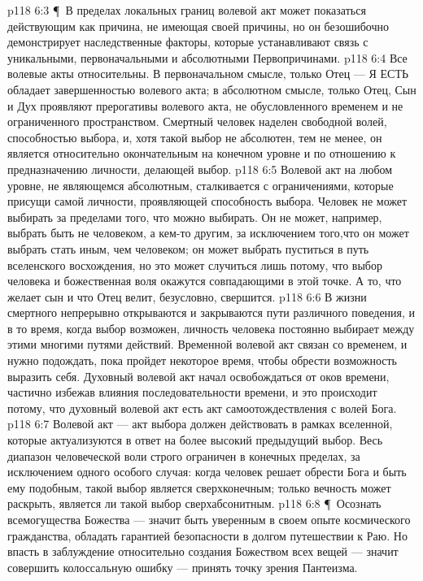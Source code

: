 \vs p118 6:3 \P\ В пределах локальных границ волевой акт может показаться действующим как причина, не имеющая своей причины, но он безошибочно демонстрирует наследственные факторы, которые устанавливают связь с уникальными, первоначальными и абсолютными Первопричинами.
\vs p118 6:4 Все волевые акты относительны. В первоначальном смысле, только Отец --- Я ЕСТЬ обладает завершенностью волевого акта; в абсолютном смысле, только Отец, Сын и Дух проявляют прерогативы волевого акта, не обусловленного временем и не ограниченного пространством. Смертный человек наделен свободной волей, способностью выбора, и, хотя такой выбор не абсолютен, тем не менее, он является относительно окончательным на конечном уровне и по отношению к предназначению личности, делающей выбор.
\vs p118 6:5 Волевой акт на любом уровне, не являющемся абсолютным, сталкивается с ограничениями, которые присущи самой личности, проявляющей способность выбора. Человек не может выбирать за пределами того, что можно выбирать. Он не может, например, выбрать быть не человеком, а кем\hyp{}то другим, за исключением того,что он может выбрать стать иным, чем человеком; он может выбрать пуститься в путь вселенского восхождения, но это может случиться лишь потому, что выбор человека и божественная воля окажутся совпадающими в этой точке. А то, что желает сын и что Отец велит, безусловно, свершится.
\vs p118 6:6 В жизни смертного непрерывно открываются и закрываются пути различного поведения, и в то время, когда выбор возможен, личность человека постоянно выбирает между этими многими путями действий. Временной волевой акт связан со временем, и нужно подождать, пока пройдет некоторое время, чтобы обрести возможность выразить себя. Духовный волевой акт начал освобождаться от оков времени, частично избежав влияния последовательности времени, и это происходит потому, что духовный волевой акт есть акт самоотождествления с волей Бога.
\vs p118 6:7 Волевой акт --- акт выбора должен действовать в рамках вселенной, которые актуализуются в ответ на более высокий предыдущий выбор. Весь диапазон человеческой воли строго ограничен в конечных пределах, за исключением одного особого случая: когда человек решает обрести Бога и быть ему подобным, такой выбор является сверхконечным; только вечность может раскрыть, является ли такой выбор сверхабсонитным.
\vs p118 6:8 \P\ Осознать всемогущества Божества --- значит быть уверенным в своем опыте космического гражданства, обладать гарантией безопасности в долгом путешествии к Раю. Но впасть в заблуждение относительно создания Божеством всех вещей --- значит совершить колоссальную ошибку --- принять точку зрения Пантеизма.

